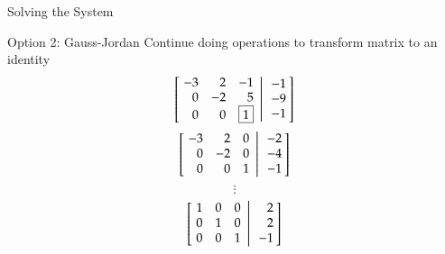 \documentclass[10pt]{beamer}
\begin{document}
\begin{frame}{Solving the System}
{\begin{block}{Option 2: Gauss-Jordan}   
    Continue doing operations to transform matrix to an identity
\begin{equation*}
        \left[
           \left.\negthickspace\begin{array}{rrr}  -3 &  2 & -1 \\
                                                    0 & -2 &  5 \\
                                                    0 &  0 & \boxed{1} \end{array}
           \right|\begin{array}{r} -1 \\ -9 \\ -1 \end{array}\negthickspace\right]
\end{equation*}
\begin{equation*}
           \left[
           \left.\negthickspace\begin{array}{rrr}  -3 &  2 &  0 \\
                                                    0 & -2 &  0 \\
                                                    0 &  0 & 1 \end{array}
           \right|\begin{array}{r} -2 \\ -4 \\ -1 \end{array}\negthickspace\right]
\end{equation*}
           $$\vdots$$
\begin{equation*}
           \left[
           \left.\negthickspace\begin{array}{rrr}  1 &  0 &  0 \\
                                                    0 & 1 &  0 \\
                                                    0 &  0 & 1 \end{array}
           \right|\begin{array}{r} 2 \\ 2 \\ -1 \end{array}\negthickspace\right]
\end{equation*}
\end{block}
}
\end{frame}

\end{document}
